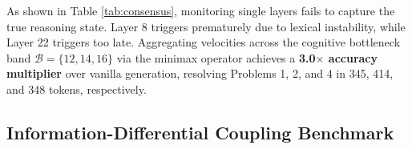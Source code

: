 \documentclass[10pt,twocolumn]{article}
\begin{document}
\begin{table}[htbp]
\centering
\small
\caption{Multi-Layer Consensus Governor ($\mathcal{B} = \{12, 14, 16\}$) vs. Single-Layer Baselines on \texttt{DeepSeek-R1-Distill-Qwen-7B}.}
\label{tab:consensus}
\end{table}

As shown in Table \ref{tab:consensus}, monitoring single layers fails to capture the true reasoning state. Layer 8 triggers prematurely due to lexical instability, while Layer 22 triggers too late. Aggregating velocities across the cognitive bottleneck band $\mathcal{B} = \{12, 14, 16\}$ via the minimax operator achieves a \textbf{3.0$\times$ accuracy multiplier} over vanilla generation, resolving Problems 1, 2, and 4 in 345, 414, and 348 tokens, respectively.

\subsection{Information-Differential Coupling Benchmark}
\end{document}
